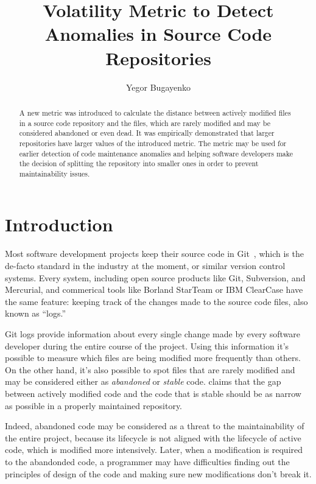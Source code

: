 \documentclass[anonymous,sigconf,10pt,nonacm=true]{acmart}
\title{Volatility Metric to Detect Anomalies in Source Code Repositories}
\author{Yegor Bugayenko}{}{}
\affiliation{%
  \institution{Huawei Technologies Co., Ltd.}
  \city{Moscow, Russia}
}
\begin{document}
\begin{abstract}
A new metric was introduced to calculate the distance
between actively modified files in a source code repository
and the files, which are rarely modified and may be considered
abandoned or even dead. It was empirically demonstrated that larger repositories
have larger values of the introduced metric.
The metric may be used for earlier detection of code maintenance anomalies
and helping software developers make the decision of splitting the repository
into smaller ones in order to prevent maintainability issues.
\end{abstract}
\maketitle

\section{Introduction}

Most software development projects keep their source code in Git~\citep{loeliger2012},
which is the de-facto standard in the industry at the moment, or similar
version control systems. Every system, including open
source products like Git, Subversion, and Mercurial, and commerical tools
like Borland StarTeam\texttrademark{} or IBM ClearCase\texttrademark{}
have the same feature: keeping track of the changes
made to the source code files, also known as ``logs.''

Git logs provide information about every single change made by every software
developer during the entire course of the project. Using this information
it's possible to measure which files are being modified more frequently than others.
On the other hand, it's also possible to spot files that are rarely modified and may
be considered either as \emph{abandoned} or \emph{stable} code.
\citet{fontana2014} claims that the gap between actively modified code
and the code that is stable should be as narrow as possible in a properly
maintained repository.

Indeed, abandoned code may be considered as a threat
to the maintainability of the entire project, because its lifecycle
is not aligned with the lifecycle of active code, which is modified more intensively.
Later, when a modification is required to the abandonded code, a programmer
may have difficulties finding out the principles of design of the code and
making sure new modifications don't break it.
\end{document}
